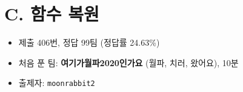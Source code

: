 \section{C. 함수 복원}

\begin{frame} %
    \begin{itemize}
        \item 제출 406번, 정답 99팀 (정답률 24.63\%)
        \item 처음 푼 팀: \textbf{여기가월파2020인가요} (월파, 치러, 왔어요), 10분
        \item 출제자: \texttt{moonrabbit2}
    \end{itemize}
\end{frame}

